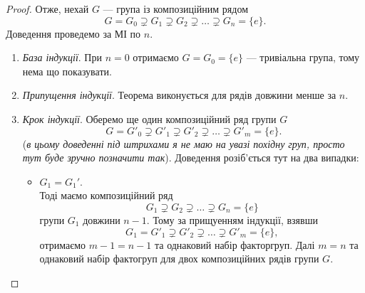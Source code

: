\documentclass{math_library}
\begin{document}
\begin{proof}
Отже, нехай $G$ --- група із композиційним рядом
\[
G = G_0 \supsetneq G_1 \supsetneq G_2 \supsetneq \dots \supsetneq G_n = \{e\}.
\]
Доведення проведемо за МІ по $n$.
\begin{enumerate}[nosep,wide=0pt,label={\Roman*.}]
\item \textit{База індукції}. При $n = 0$ отримаємо $G = G_0 = \{e\}$ --- тривіальна група, тому нема що показувати.

\item \textit{Припущення індукції}. Теорема виконується для рядів довжини менше за $n$.

\item \textit{Крок індукції}. Оберемо ще один композиційний ряд групи $G$ 
\[
G = G'_0 \supsetneq G'_1 \supsetneq G'_2 \supsetneq \dots \supsetneq G'_m = \{e\}.
\]
(\textit{в цьому доведенні під штрихами я не маю на увазі похідну груп, просто тут буде зручно позначити так}). Доведення розіб'ється тут на два випадки:
\begin{itemize}[wide=0pt]
\item $G_1 = G_1'$. \\
Тоді маємо композиційний ряд 
\[
G_1 \supsetneq G_2 \supsetneq \dots \supsetneq G_n = \{e\}
\]
групи $G_1$ довжини $n-1$. Тому за прищуенням індукції, взявши 
\[
G_1 = G'_1 \supsetneq G'_2 \supsetneq \dots \supsetneq G'_m = \{e\},
\]
отримаємо $m-1 = n-1$ та однаковий набір факторгруп. Далі $m = n$ та однаковий набір фактогруп для двох композиційних рядів групи $G$.


\end{itemize}
\end{enumerate}
\end{proof}
\end{document}
